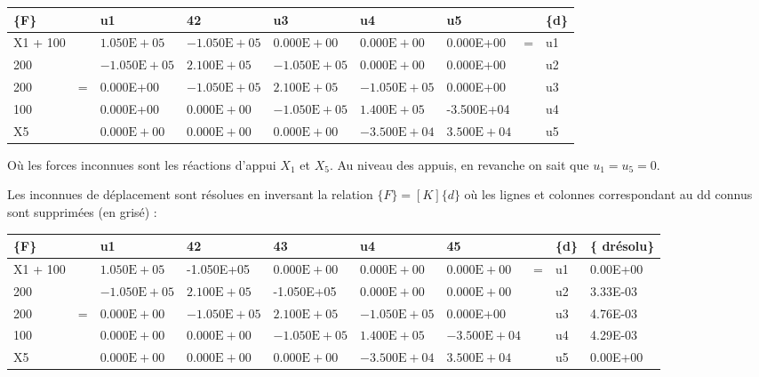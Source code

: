 \documentclass[11pt,a4paper]{report}
\begin{document}
{\begin{center}
\begin{tabular}{|l|l|l|l|l|l|l|l|l|}
\hline
\{F\} &  & u1 & 42 & u3 & u4 & u5 &  & \{d\} \\
\hline
X1 + 100 &  & $1.050 \mathrm{E}+05$ & $-1.050 \mathrm{E}+05$ & $0.000 \mathrm{E}+00$ & $0.000 \mathrm{E}+00$ & 0.000E+00 & \multirow{5}{*}{=} & u1 \\
\hline
200 &  & $-1.050 \mathrm{E}+05$ & $2.100 \mathrm{E}+05$ & $-1.050 \mathrm{E}+05$ & $0.000 \mathrm{E}+00$ & 0.000E+00 &  & u2 \\
\hline
200 & \multirow[t]{3}{*}{=} & 0.000E+00 & $-1.050 \mathrm{E}+05$ & $2.100 \mathrm{E}+05$ & $-1.050 \mathrm{E}+05$ & 0.000E+00 &  & u3 \\
\hline
100 &  & 0.000E+00 & $0.000 \mathrm{E}+00$ & $-1.050 \mathrm{E}+05$ & $1.400 \mathrm{E}+05$ & -3.500E+04 &  & u4 \\
\hline
X5 &  & $0.000 \mathrm{E}+00$ & $0.000 \mathrm{E}+00$ & $0.000 \mathrm{E}+00$ & $-3.500 \mathrm{E}+04$ & $3.500 \mathrm{E}+04$ &  & u5 \\
\hline
\end{tabular}
\end{center}

Où les forces inconnues sont les réactions d'appui $X_{1}$ et $X_{5}$. Au niveau des appuis, en revanche on sait que $u_{1}=u_{5}=0$.

Les inconnues de déplacement sont résolues en inversant la relation $\{F\}=[K]\{d\}$ où les lignes et colonnes correspondant au dd connus sont supprimées (en grisé) :

\begin{center}
\begin{tabular}{|l|l|l|l|l|l|l|l|l|l|}
\hline
\{F\} &  & u1 & 42 & 43 & u4 & 45 &  & \{d\} & \{ drésolu\} \\
\hline
X1 + 100 &  & $1.050 \mathrm{E}+05$ & -1.050E+05 & $0.000 \mathrm{E}+00$ & $0.000 \mathrm{E}+00$ & $0.000 \mathrm{E}+00$ & \multirow{5}{*}{=} & u1 & 0.00E+00 \\
\hline
200 &  & $-1.050 \mathrm{E}+05$ & $2.100 \mathrm{E}+05$ & -1.050E+05 & $0.000 \mathrm{E}+00$ & $0.000 \mathrm{E}+00$ &  & u2 & 3.33E-03 \\
\hline
200 & \multirow[t]{3}{*}{=} & $0.000 \mathrm{E}+00$ & $-1.050 \mathrm{E}+05$ & $2.100 \mathrm{E}+05$ & $-1.050 \mathrm{E}+05$ & 0.000E+00 &  & u3 & 4.76E-03 \\
\hline
100 &  & $0.000 \mathrm{E}+00$ & $0.000 \mathrm{E}+00$ & $-1.050 \mathrm{E}+05$ & $1.400 \mathrm{E}+05$ & $-3.500 \mathrm{E}+04$ &  & u4 & 4.29E-03 \\
\hline
X5 &  & $0.000 \mathrm{E}+00$ & $0.000 \mathrm{E}+00$ & $0.000 \mathrm{E}+00$ & $-3.500 \mathrm{E}+04$ & $3.500 \mathrm{E}+04$ &  & u5 & 0.00E+00 \\
\hline
\end{tabular}
\end{center}

}
\end{document}

